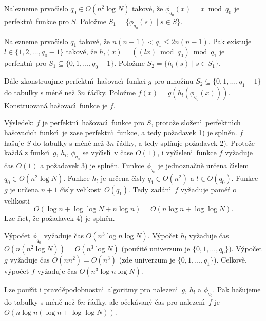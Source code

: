 \roster
\item 
Nalezneme prvo\v c\'\i slo $q_0\in O(n^2\log N)$ takov\'e, \v ze 
$\phi_{q_0}(x)=x\bmod q_0$ je perfektn\'\i\ funkce pro $S$. Polo\v zme 
$S_1=\{\phi_{q_0}(s)\mid s\in S\}$.
\item
Nalezneme prvo\v c\'\i slo $q_1$ takov\'e, \v ze 
$n(n-1)<q_1\le 2n(n-1)$. Pak existuje 
$l\in \{1,2,\dots,q_0-1\}$ takov\'e, \v ze $h_l(x)=((lx)\bmod q_0
)\bmod q_1$ 
je perfektn\'\i\ pro $S_1\subseteq \{0,1,\dots,q_0-1\}$. Polo\v zme 
$S_2=\{h_l(s)\mid s\in S_1\}$.
\item
D\'ale zkonstruujme perfektn\'\i\ ha\v sovac\'\i\ funkci 
$g$ pro mno\v zinu 
$S_2\subseteq \{0,1,\dots,q_1-1\}$ do tabulky s m\'en\v e ne\v z $
3n$ \v r\'adky. 
Polo\v zme $f(x)=g(h_l(\phi_{q_0}(x)))$. Konstruovan\'a ha\v sovac\'\i\ 
funkce je $f$.
\endroster

\flushpar V\'ysledek: $f$ je perfektn\'\i\ ha\v sovac\'\i\ funkce pro $
S$, proto\v ze 
slo\v zen\'\i\ perfektn\'\i ch ha\v sovac\'\i ch funkc\'\i\ je zase perfektn\'\i\ 
funkce, a tedy po\v zadavek 1) je spln\v en. \newline 
$f$ ha\v suje $S$ do tabulky s m\'en\v e ne\v z $3n$ \v r\'adky, a tedy 
spl\v nuje po\v zadavek 2). \newline 
Proto\v ze ka\v zd\'a z funkc\'\i\ $g$, $h_l$, $\phi_{q_0}$ se vy\v c\'\i sl\'\i\ v \v case $
O(1)$, 
i vy\v c\'\i slen\'\i\ funkce $f$ vy\v zaduje \v cas $O(1)$ a po\v zadavek 3) je 
spln\v en.\newline 
Funkce $\phi_{q_0}$ je jednozna\v cn\v e ur\v cena \v c\'\i slem $
q_0\in O(n^2\log N)$. 
Funkce $h_l$ je ur\v cena \v c\'\i sly $q_1\in O(n^2)$ a $l\in O(
q_0)$. Funkce $g$ 
je ur\v cena $n+1$ \v c\'\i sly velikosti $O(q_1)$. Tedy zad\'an\'\i\ $
f$ 
vy\v zaduje pam\v e\v t o velikosti 
$$O(\log n+\log\log N+n\log n)=O(n\log n+\log\log N).$$
Lze \v r\'\i ct, \v ze po\v zadavek 4) je spln\v en. 
\medskip

\flushpar V\'ypo\v cet $\phi_{q_0}$ vy\v zaduje \v cas $O(n^3\log 
n\log N)$. V\'ypo\v cet $h_l$ 
vy\v za\-du\-je \v cas $O(n(n^2\log N))=O(n^3\log N)$ (pou\v zit\'e univerzum je 
$\{0,1,\dots,q_0\}$). V\'ypo\v cet $g$ vy\v zaduje \v cas $O(nn^2
)=O(n^3)$ 
(zde univerzum je $\{0,1,\dots,q_1\}$). Celkov\v e, 
v\'ypo\v cet $f$ vy\v zaduje \v cas $O(n^3\log n\log N)$.
\medskip

\flushpar Lze pou\v z\'\i t i pravd\v epodobnostn\'\i\ algoritmy pro nalezen\'\i\ 
$g$, $h_l$ a $\phi_{q_0}$. Pak ha\v sujeme do tabulky s m\'en\v e ne\v z $
6n$ 
\v r\'adky, ale o\v cek\'avan\'y \v cas pro nalezen\'\i\ $f$ je 
$O(n\log n(\log n+\log\log N))$.
\bigskip

